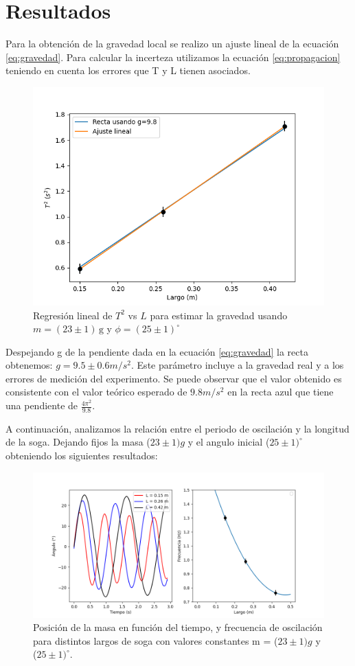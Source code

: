 \documentclass[12pt,a4]{article}
\begin{document}
\section{Resultados}

Para la obtención de la gravedad local se realizo un ajuste lineal de la ecuación \ref{eq:gravedad}. 
Para calcular la incerteza utilizamos la ecuación \ref{eq:propagacion} teniendo en cuenta los errores que T y L tienen asociados.

\begin{figure}[H]
    \centering
    \includegraphics[width=0.6\linewidth]{gravedad.png}
    \caption{Regresión lineal de \( T^2 \) vs \( L \) para estimar la gravedad usando $m = (23 \pm 1) \, \text{g}$ y $\phi = (25 \pm 1)^\circ$}
    \label{fig:gravedad}
\end{figure}

Despejando g de la pendiente dada en la ecuación \ref{eq:gravedad} la recta obtenemos: $g = 9.5 \pm 0.6 m/s^2$. Este parámetro incluye a la gravedad real y a los errores de medición del experimento. Se puede observar que el valor obtenido es consistente con el valor teórico esperado de $9.8 m/s^2$ en la recta azul que tiene una pendiente de $\frac{4\pi^2}{9.8}$.

A continuación, analizamos la relación entre el periodo de oscilación y la longitud de la soga. Dejando fijos la masa ($23 \pm 1) g$ y el angulo inicial ($25 \pm 1) ^\circ$ obteniendo los siguientes resultados:

\begin{figure}[H]
    \centering
    \includegraphics[width=0.6\linewidth]{largo.png}
    \caption{Posición de la masa en función del tiempo, y frecuencia de oscilación para distintos largos de soga con valores constantes m = ($23 \pm 1) g$ y ($25 \pm 1) ^\circ$.}
    \label{fig:largo}
\end{figure}
\end{document}

